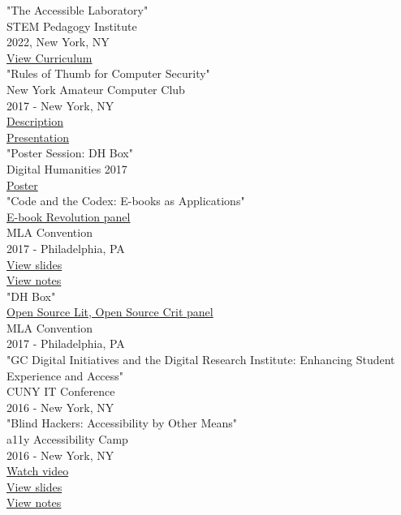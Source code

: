 \documentclass[11pt]{article}
\begin{document}
"The Accessible Laboratory"\\
STEM Pedagogy Institute\\
2022, New York, NY\\
\href{https://iotaschool.com/resource/sequence/u/patrick/s/the-accessible-laboratory}{View Curriculum}\\

"Rules of Thumb for Computer Security"\\
New York Amateur Computer Club\\
2017 - New York, NY\\
\href{http://nyacc.org/}{Description}\\
\href{http://htmlpreview.github.io/?https://github.com/smythp/security-workshop/blob/master/presentation/index.html#/sec-title-slide}{Presentation}\\

"Poster Session: DH Box"\\
Digital Humanities 2017\\
\href{https://smythp.com/images/dh_box_poster.pdf}{Poster}\\

"Code and the Codex: E-books as Applications"\\
\href{https://apps.mla.org/program_details?prog_id=75&year=2017}{E-book Revolution panel}\\
MLA Convention\\
2017 - Philadelphia, PA\\
\href{http://htmlpreview.github.io/?https://github.com/smythp/ebooks-as-applications/blob/master/presentation.html#/sec-title-slide}{View slides}\\
\href{https://github.com/smythp/ebooks-as-applications#ebooks-as-applications}{View notes}\\

"DH Box"\\
\href{https://text.mla.hcommons.org/}{Open Source Lit, Open Source Crit panel}\\
MLA Convention\\
2017 - Philadelphia, PA\\

"GC Digital Initiatives and the Digital Research Institute: Enhancing Student Experience and Access"\\
CUNY IT Conference\\
2016 - New York, NY\\

"Blind Hackers: Accessibility by Other Means"\\
a11y Accessibility Camp\\
2016 - New York, NY\\
\href{https://www.youtube.com/watch?v=W8_O3joo4aU}{Watch video}\\
\href{http://htmlpreview.github.io/?https://github.com/smythp/blind-hackers/blob/master/presentation/foo.html}{View slides}\\
\href{https://github.com/smythp/blind-hackers}{View notes}\\
\end{document}

